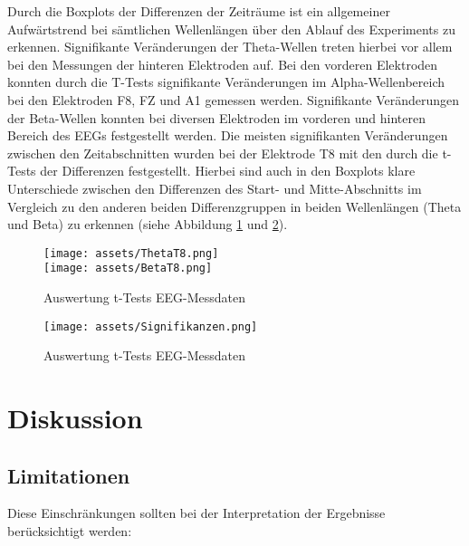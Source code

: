 \documentclass[conference]{IEEEtran}
\begin{document}
Durch die Boxplots der Differenzen der Zeiträume ist ein allgemeiner Aufwärtstrend bei sämtlichen Wellenlängen über den Ablauf des Experiments zu erkennen. Signifikante Veränderungen der Theta-Wellen treten hierbei vor allem bei den Messungen der hinteren Elektroden auf. Bei den vorderen Elektroden konnten durch die T-Tests signifikante Veränderungen im Alpha-Wellenbereich bei den Elektroden F8, FZ und A1 gemessen werden. Signifikante Veränderungen der Beta-Wellen konnten bei diversen Elektroden im vorderen und hinteren Bereich des EEGs festgestellt werden. Die meisten signifikanten Veränderungen zwischen den Zeitabschnitten wurden bei der Elektrode T8 mit den durch die t-Tests der Differenzen festgestellt. Hierbei sind auch in den Boxplots klare Unterschiede zwischen den Differenzen des Start- und Mitte-Abschnitts im Vergleich zu den anderen beiden Differenzgruppen in beiden Wellenlängen (Theta und Beta) zu erkennen (siehe Abbildung \ref{fig:boxplots_eeg} und \ref{fig:auswertung_t_test_eeg}).

\begin{figure}[ht]
	\centering
	
	\texttt{[image: assets/ThetaT8.png]} \\
	\vspace{2pt}
	\texttt{[image: assets/BetaT8.png]} \hspace{-5pt}
	\caption{Auswertung t-Tests EEG-Messdaten}
	\label{fig:boxplots_eeg}
\end{figure}

\begin{figure}[ht]
	\centering
	\texttt{[image: assets/Signifikanzen.png]} \hspace{-5pt}
	\caption{Auswertung t-Tests EEG-Messdaten}
	\label{fig:auswertung_t_test_eeg}
\end{figure}

\section{Diskussion}
\subsection{Limitationen}
Diese Einschränkungen sollten bei der Interpretation der Ergebnisse berücksichtigt werden:
\end{document}
